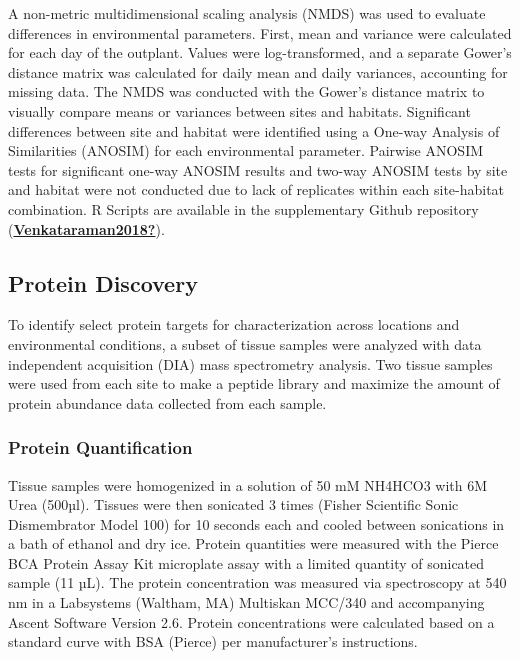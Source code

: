 \documentclass [11pt, proquest] {uwthesis}[2015/03/03]
\begin{document}
A non-metric multidimensional scaling analysis (NMDS) was used to evaluate differences in environmental parameters. First, mean and variance were calculated for each day of the outplant. Values were log-transformed, and a separate Gower's distance matrix was calculated for daily mean and daily variances, accounting for missing data. The NMDS was conducted with the Gower's distance matrix to visually compare means or variances between sites and habitats. Significant differences between site and habitat were identified using a One-way Analysis of Similarities (ANOSIM) for each environmental parameter. Pairwise ANOSIM tests for significant one-way ANOSIM results and two-way ANOSIM tests by site and habitat were not conducted due to lack of replicates within each site-habitat combination. R Scripts are available in the supplementary Github repository (\protect\hyperlink{ref-Venkataraman2018}{\textbf{Venkataraman2018?}}).

\hypertarget{protein-discovery}{%
\subsection{Protein Discovery}\label{protein-discovery}}

To identify select protein targets for characterization across locations and environmental conditions, a subset of tissue samples were analyzed with data independent acquisition (DIA) mass spectrometry analysis. Two tissue samples were used from each site to make a peptide library and maximize the amount of protein abundance data collected from each sample.

\hypertarget{protein-quantification}{%
\subsubsection{Protein Quantification}\label{protein-quantification}}

Tissue samples were homogenized in a solution of 50 mM NH4HCO3 with 6M Urea (500µl). Tissues were then sonicated 3 times (Fisher Scientific Sonic Dismembrator Model 100) for 10 seconds each and cooled between sonications in a bath of ethanol and dry ice. Protein quantities were measured with the Pierce BCA Protein Assay Kit microplate assay with a limited quantity of sonicated sample (11 µL). The protein concentration was measured via spectroscopy at 540 nm in a Labsystems (Waltham, MA) Multiskan MCC/340 and accompanying Ascent Software Version 2.6. Protein concentrations were calculated based on a standard curve with BSA (Pierce) per manufacturer's instructions.
\end{document}
